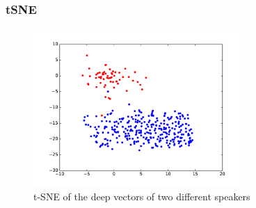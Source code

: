 \documentclass[11pt,english]{beamer}
\begin{document}
\begin{frame}
  \frametitle{tSNE}
  \begin{figure}[!h]
      \centering
      \includegraphics[width=8cm]{../secondNet/tSNE_HOUDIN_TRUCHOT.pdf}
      \caption{t-SNE of the deep vectors of two different speakers}
  \end{figure}
\end{frame}


\newcommand\experiment[6]{%
  \begin{frame}
    \frametitle{Experiment #1}
    \begin{columns}
      \only<1>{\column{0.6\textwidth}}
      \only<2>{\column{0.35\textwidth}}
        \begin{table}
          \centering
          \resizebox{\columnwidth}{!}{%
          \begin{tabular}{|c|c|c|c|c|c|c|c|}
            \hline
            Number of layers & \multicolumn{#2}{c|}{#2} \\ \hline
            Size of layers   & #3                       \\ \hline
            Tied weights     & \multicolumn{#2}{c|}{#4} \\ \hline
            Optimizer        & \multicolumn{#2}{c|}{#5} \\ \hline
            Dropout          & \multicolumn{#2}{c|}{#6} \\ \hline
          \end{tabular}
          }
        \end{table}
      \only<1>{\column{0.35\textwidth}}
      \only<2>{\column{0.6\textwidth}}
      \begin{figure}[!h]
          \centering
          \texttt{[image: ../scores/det\#1.pdf]}
      \end{figure}
    \end{columns}
  \end{frame}
}
\end{document}
